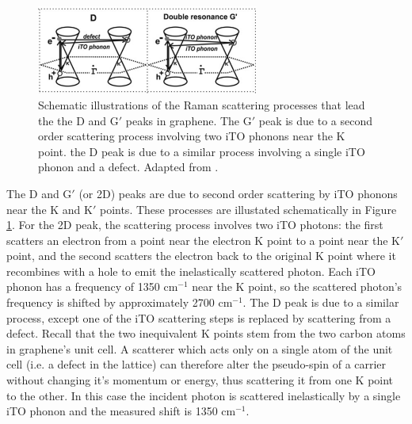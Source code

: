 \documentclass[edeposit,fullpage,draftthesis]{uiucthesis2009}
\begin{document}
            \begin{figure}
            \centering
            \includegraphics[width=0.65\textwidth]{images/background/raman_scattering.png}
            \caption[Phonon scattering processes for the D and 2D Raman peaks]{
            Schematic illustrations of the Raman scattering processes that lead the the D and G$'$ peaks in
            graphene. The G$'$ peak is due to a second order scattering process involving two iTO phonons
            near the K point. the D peak is due to a similar process involving a single iTO phonon and a defect.
            Adapted from \cite{malard2009raman}.
            }
            \label{fig:raman_scattering}
            \end{figure}
 
        The D and G$'$ (or 2D) peaks are due to second order scattering by iTO phonons near the K and K$'$ points.
        These processes are illustated schematically in Figure \ref{fig:raman_scattering}.
        For the 2D peak, the scattering process involves two iTO photons: the first scatters an
        electron from a point near the electron K point to a point near the K$'$ point, and the 
        second scatters the electron back to the original K point where it recombines with a hole
        to emit the inelastically scattered photon. Each iTO phonon has a frequency of 1350 cm$^{-1}$
        near the K point, so the scattered photon's frequency is shifted by approximately 2700 cm$^{-1}$.
        The D peak is due to a similar process, except one of the iTO scattering steps is replaced
        by scattering from a defect. Recall that the two inequivalent K points stem from the two carbon
        atoms in graphene's unit cell. A scatterer which acts only on a single atom of the unit cell (i.e.
        a defect in the lattice) can therefore alter the pseudo-spin of a carrier without changing it's 
        momentum or energy, thus scattering it from one K point to the other. In this case the incident photon 
        is scattered inelastically by a single iTO phonon and the measured shift is 1350 cm$^{-1}$.
        
\end{document}
